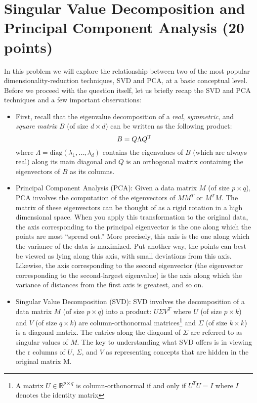 \section{Singular Value Decomposition and Principal Component Analysis (20 points)}

In this problem we will explore the relationship between two of the most popular dimensionality-reduction techniques, SVD and PCA, at a basic conceptual level. Before we proceed with the question itself, let us briefly recap the SVD and PCA techniques and a few important observations:
\begin{itemize}
\item First, recall that the eigenvalue decomposition of a \emph{real}, \emph{symmetric}, and \emph{square matrix} $B$ (of size $d \times d$) can be written as the following product:
\[
	B = Q \Lambda {Q}^{\mathrm{T}}
\]
where $\Lambda = \text{diag}(\lambda_1, \dots, \lambda_d)$ contains the eigenvalues of $B$ (which are always real) along its main diagonal and $Q$ is an orthogonal matrix containing the eigenvectors of $B$ as its columns. 

\item Principal Component Analysis (PCA): Given a data matrix $M$ (of size $p \times q$), PCA involves the computation of the eigenvectors of $M M^T$ or $M^T M$. The matrix of these eigenvectors can be thought of as a rigid rotation in a high dimensional space. When you apply this transformation to the original data,
the axis corresponding to the principal eigenvector is the one along which the
points are most “spread out.” More precisely, this axis is the one along which
the variance of the data is maximized. Put another way, the points can best be
viewed as lying along this axis, with small deviations from this axis. Likewise,
the axis corresponding to the second eigenvector (the eigenvector corresponding
to the second-largest eigenvalue) is the axis along which the variance of
distances from the first axis is greatest, and so on.
\item Singular Value Decomposition (SVD): SVD involves the decomposition of a data matrix $M$ (of size $p \times q$) into a product: $U \Sigma V^T$ where $U$ (of size $p \times k$) and $V$ (of size $q \times k$) are column-orthonormal matrices\footnote{A matrix $U \in \mathbb{R}^{p \times q}$ is column-orthonormal if and only if $U^TU = I$ where $I$ denotes the identity matrix} and $\Sigma$ (of size $k \times k$) is a diagonal matrix. The entries along the diagonal of $\Sigma$ are referred to as singular values of $M$. The key to understanding what SVD offers is in viewing the r columns of $U$, $\Sigma$, and $V$ as representing concepts that are hidden in the original matrix M.
\end{itemize}

